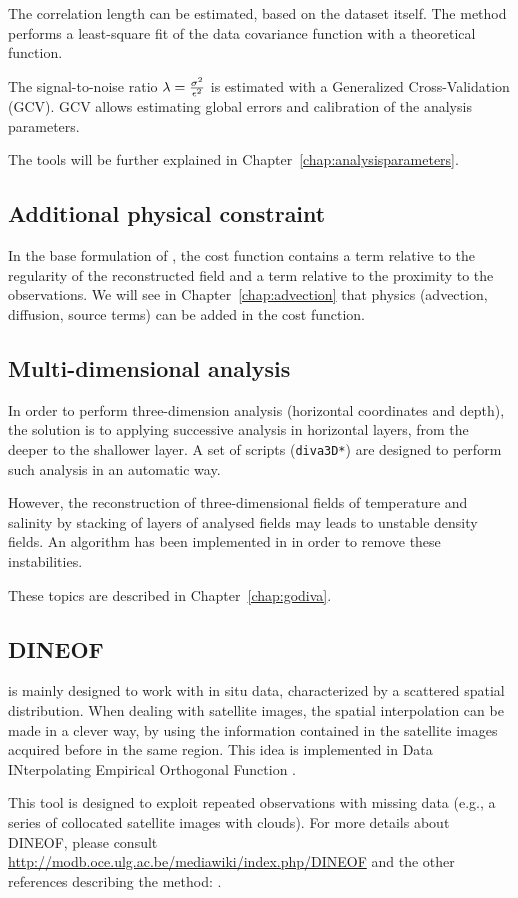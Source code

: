 The correlation length can be estimated, based on the dataset itself. The method performs a least-square fit of the data covariance function with a theoretical function. 

The signal-to-noise ratio $\lambda=\frac{\sigma^{2}}{\epsilon^{2}}$ is estimated with a Generalized Cross-Validation (GCV). GCV allows estimating global errors and calibration of the analysis parameters. 

The tools will be further explained in Chapter~\ref{chap:analysisparameters}.
 
\subsection{Additional physical constraint}

In the base formulation of \diva, the cost function contains a term relative to the regularity of the reconstructed field and a term relative to the proximity to the observations. We will see in Chapter~\ref{chap:advection} that physics (advection, diffusion, source terms) can be added in the cost function.

\subsection{Multi-dimensional analysis}

In order to perform three-dimension analysis (horizontal coordinates and depth), the solution is to applying successive analysis in horizontal layers, from the deeper to the shallower layer. A set of scripts (\texttt{diva3D*}) are designed to perform such analysis in an automatic way.

However, the reconstruction of three-dimensional fields of temperature and salinity by stacking of layers of analysed fields may leads to unstable density fields. An algorithm has been implemented in \diva in order to remove these instabilities.

These topics are described in Chapter~\ref{chap:godiva}.


\subsection{DINEOF\label{sec:DINEOF}}

\diva is mainly designed to work with in situ data, characterized by a scattered spatial distribution. When dealing with satellite images, the spatial interpolation can be made in a clever way, by using the information contained in the satellite images acquired before in the same region. This idea is implemented in Data INterpolating Empirical Orthogonal Function \citep[DINEOF;][]{BECKERS03,ALVERA05}.

This tool is designed to exploit repeated observations with missing data (e.g., a series of collocated satellite images with clouds). 
For more details about DINEOF, please consult \url{http://modb.oce.ulg.ac.be/mediawiki/index.php/DINEOF} and the other references describing the method: \cite{ALVERA05,ALVERA07,ALVERA09,BECKERS06}.


